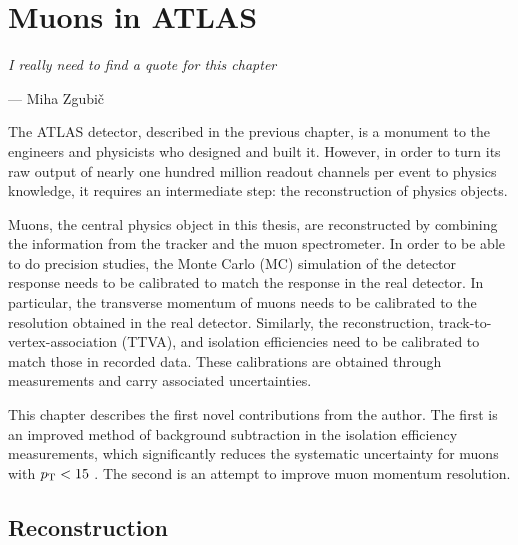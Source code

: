 \chapter{Muons in ATLAS}
  
\textit{I really need to find a quote for this chapter}
\vspace{5mm}
\begin{flushright}
--- Miha Zgubi\v{c}
\end{flushright}

\thispagestyle{empty}
\newpage
The ATLAS detector, described in the previous chapter, is a monument
to the engineers and physicists who designed and built it. However,
in order to turn its raw output of nearly one hundred million readout
channels per event to physics knowledge, it requires an intermediate step:
the reconstruction of physics objects.

Muons, the central physics object in this thesis, are reconstructed
by combining the information from the tracker and the muon spectrometer.
In order to be able to do precision studies, the Monte Carlo (MC)
simulation of the detector response needs to be calibrated to match
the response in the real detector. In particular, the transverse momentum of
muons needs to be calibrated to the resolution obtained in the real
detector. Similarly, the reconstruction, track-to-vertex-association (TTVA),
and isolation efficiencies need to be calibrated to match those in 
recorded data. These calibrations are obtained through measurements
and carry associated uncertainties.

This chapter describes the first novel contributions from the author.
The first is an improved method of background subtraction in the isolation
efficiency measurements, which significantly reduces the systematic
uncertainty for muons with $p_{\text{T}} < 15$ \GeV. The second is an attempt
to improve muon momentum resolution.

\section{Reconstruction}

